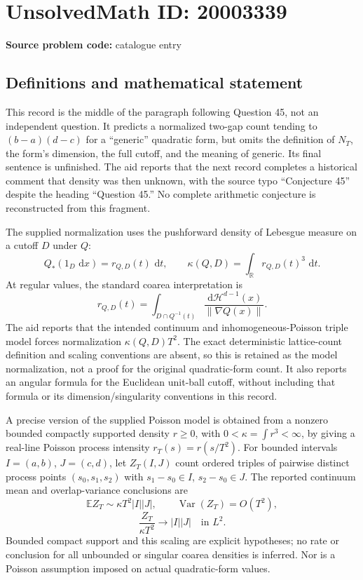 \documentclass[11pt]{article}
\newcommand{\R}{\mathbb{R}}
\newcommand{\E}{\mathbb{E}}
\newcommand{\dd}{\,\mathrm{d}}
\begin{document}
\section*{UnsolvedMath ID: 20003339}
\textbf{Source problem code:} catalogue entry
\subsection{Definitions and mathematical statement}
This record is the middle of the paragraph following Question 45, not an independent question. It predicts a normalized two-gap count tending to \((b-a)(d-c)\) for a ``generic'' quadratic form, but omits the definition of \(N_T\), the form's dimension, the full cutoff, and the meaning of generic. Its final sentence is unfinished. The aid reports that the next record completes a historical comment that density was then unknown, with the source typo ``Conjecture 45'' despite the heading ``Question 45.'' No complete arithmetic conjecture is reconstructed from this fragment.

The supplied normalization uses the pushforward density of Lebesgue measure on a cutoff \(D\) under \(Q\):
\[
 Q_*(1_D\,\dd x)=r_{Q,D}(t)\,\dd t,
 \qquad\kappa(Q,D)=\int_\R r_{Q,D}(t)^3\,\dd t.
\]
At regular values, the standard coarea interpretation is
\[
 r_{Q,D}(t)=\int_{D\cap Q^{-1}(t)}\frac{\dd\mathcal H^{d-1}(x)}{\|\nabla Q(x)\|}.
\]
The aid reports that the intended continuum and inhomogeneous-Poisson triple model forces normalization \(\kappa(Q,D)T^2\). The exact deterministic lattice-count definition and scaling conventions are absent, so this is retained as the model normalization, not a proof for the original quadratic-form count. It also reports an angular formula for the Euclidean unit-ball cutoff, without including that formula or its dimension/singularity conventions in this record.

A precise version of the supplied Poisson model is obtained from a nonzero bounded compactly supported density \(r\geq0\), with \(0<\kappa=\int r^3<\infty\), by giving a real-line Poisson process intensity \(r_T(s)=r(s/T^2)\). For bounded intervals \(I=(a,b)\), \(J=(c,d)\), let \(Z_T(I,J)\) count ordered triples of pairwise distinct process points \((s_0,s_1,s_2)\) with \(s_1-s_0\in I\), \(s_2-s_0\in J\). The reported continuum mean and overlap-variance conclusions are
\[
 \E Z_T\sim\kappa T^2|I||J|,\qquad
 \operatorname{Var}(Z_T)=O(T^2),
\]
\[
 \frac{Z_T}{\kappa T^2}\longrightarrow|I||J|\quad\text{in }L^2.
\]
Bounded compact support and this scaling are explicit hypotheses; no rate or conclusion for all unbounded or singular coarea densities is inferred. Nor is a Poisson assumption imposed on actual quadratic-form values.
\end{document}
